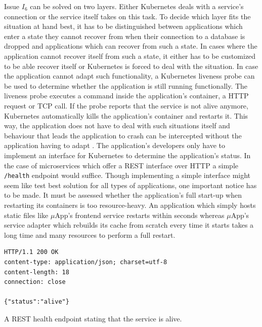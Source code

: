 Issue $I_6$ can be solved on two layers. Either Kubernetes deals with a
service's connection or the service itself takes on this task. To decide which
layer fits the situation at hand best, it has to be distinguished between
applications which enter a state they cannot recover from when their
connection to a database is dropped and applications which can recover from
such a state. In cases where the application cannot recover itself from such a
state, it either has to be customized to be able recover itself or Kubernetes
is forced to deal with the situation. In case the application cannot adapt
such functionality, a Kubernetes liveness probe can be used to determine
whether the application is still running functionally. The liveness probe
executes a command inside the application's container, a \ac{HTTP} request or
\ac{TCP} call. If the probe reports that the service is not alive anymore,
Kubernetes automatically kills the application's container and restarts it.
This way, the application does not have to deal with such situations itself and
behaviour that leads the application to crash can be intercepted without the
application having to adapt \autocite{AuthorsConfigureLivenessReadiness2019}.
The application's developers only have to implement an interface for Kubernetes
to determine the application's status. In the case of microservices which offer
a \ac{REST} interface over \ac{HTTP} a simple \texttt{/health} endpoint would
suffice. Though implementing a simple interface might seem like test best
solution for all types of applications, one important notice has to be made. It
must be assessed whether the application's full start-up when restarting its
containers is too resource-heavy. An application which simply hosts static
files like $\mu$App's frontend service restarts within seconds whereas
$\mu$App's service adapter which rebuilds its cache from scratch every time it
starts takes a long time and many resources to perform a full restart.

\begin{listing}[H]
  \begin{verbatim}
HTTP/1.1 200 OK
content-type: application/json; charset=utf-8
content-length: 18
connection: close

{"status":"alive"}
  \end{verbatim}
  \caption[A REST health endpoint stating that the service is alive.]{A
  \ac{REST} health endpoint stating that the service is alive.}%
  \label{listing:health_endpoint_http}
\end{listing}

